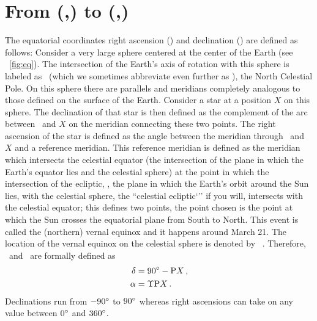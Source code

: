 
\section{From (\ra,\dec) to (\gall,\galb)}

The equatorial coordinates right ascension (\ra) and declination
(\dec) are defined as follows: Consider a very large sphere centered
at the center of the Earth (see \figurename~\ref{fig:eq}). The
intersection of the Earth's axis of rotation with this sphere is
labeled as \ncp\ (which we sometimes abbreviate even further as
\ncpp), the North Celestial Pole. On this sphere there are parallels
and meridians completely analogous to those defined on the surface of
the Earth. Consider a star at a position $X$ on this sphere. The
declination of that star is then defined as the complement of the arc
between \ncp\ and $X$ on the meridian connecting these two points. The
right ascension of the star is defined as the angle between the
meridian through \ncp\ and $X$ and a reference meridian. This
reference meridian is defined as the meridian which intersects the
celestial equator (the intersection of the plane in which the Earth's
equator lies and the celestial sphere) at the point in which the
intersection of the ecliptic, \ie, the plane in which the Earth's
orbit around the Sun lies, with the celestial sphere, the ``celestial
ecliptic`'' if you will, intersects with the celestial equator; this
defines two points, the point chosen is the point at which the Sun
crosses the equatorial plane from South to North. This event is called
the (northern) vernal equinox and it happens around March 21. The
location of the vernal equinox on the celestial sphere is denoted by
\vernal\ \citep[][pp.14-6]{Green85a}. Therefore, \ra\ and \dec\ are
formally defined as
\begin{align}
\delta &= 90^{\circ} - \textnormal{P} X\, ,\\
\alpha &= \Upsilon \textnormal{P} X \, .
\end{align}
Declinations run from $-90^{\circ}$ to $90^{\circ}$ whereas right
ascensions can take on any value between $0^{\circ}$ and $360^{\circ}$.

